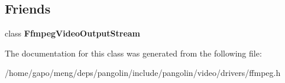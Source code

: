 \subsection*{Friends}
\begin{DoxyCompactItemize}
\item 
class {\bfseries Ffmpeg\+Video\+Output\+Stream}\hypertarget{classpangolin_1_1_ffmpeg_video_output_a1a5cda24c7a6f613553098210e328b72}{}\label{classpangolin_1_1_ffmpeg_video_output_a1a5cda24c7a6f613553098210e328b72}

\end{DoxyCompactItemize}


The documentation for this class was generated from the following file\+:\begin{DoxyCompactItemize}
\item 
/home/gapo/meng/deps/pangolin/include/pangolin/video/drivers/ffmpeg.\+h\end{DoxyCompactItemize}
